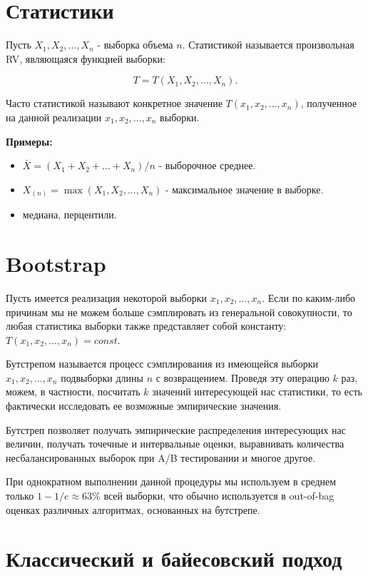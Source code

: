 \section{Статистики}

Пусть $X_1, X_2, ..., X_n$ - выборка объема $n$. Статистикой называется произвольная RV, являющаяся функцией выборки:

$$
T = T(X_1, X_2, ..., X_n).
$$

Часто статистикой называют конкретное значение $T(x_1, x_2, ..., x_n)$, полученное на данной реализации $x_1, x_2, ..., x_n$ выборки.

\textbf{Примеры:}
\begin{itemize}
    \item $\bar{X} = (X_1 + X_2 + ... + X_n)/n$ - выборочное среднее.
    \item $X_{(n)} = \max(X_1, X_2, ..., X_n)$ - максимальное значение в выборке.
    \item медиана, перцентили.
\end{itemize}


\section{Bootstrap}

Пусть имеется реализация некоторой выборки $x_1, x_2, ..., x_n$. Если по каким-либо причинам мы не можем больше сэмплировать из генеральной совокупности, то любая статистика выборки также представляет собой константу: $T(x_1, x_2, ..., x_n) = const$. 

Бутстрепом называется процесс сэмплирования из имеющейся выборки $x_1, x_2, ..., x_n$ подвыборки длины $n$ с возвращением. Проведя эту операцию $k$ раз, можем, в частности, посчитать $k$ значений интересующей нас статистики, то есть фактически исследовать ее возможные эмпирические значения.

Бутстреп позволяет получать эмпирические распределения интересующих нас величин, получать точечные и интервальные оценки, выравнивать количества несбалансированных выборок при A/B тестировании и многое другое.

При однократном выполнении данной процедуры мы используем в среднем только $1 - 1/e \approx 63\%$ всей выборки, что обычно используется в out-of-bag оценках различных алгоритмах, основанных на бутстрепе.


\section{Классический и байесовский подход}

